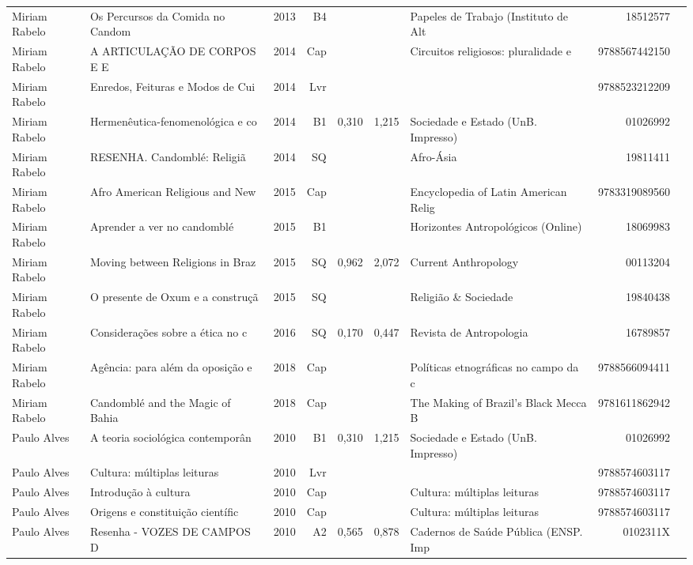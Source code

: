\documentclass[12pt,brazil]{article}\usepackage[]{graphicx}\usepackage[]{xcolor}
\begin{document}
\begin{longtable}{lllrrllrr}
Miriam Rabelo & Os Percursos da Comida no Candom & 2013 & B4 &  &  & Papeles de Trabajo (Instituto de Alt & 18512577 \\
Miriam Rabelo & A ARTICULAÇÃO DE CORPOS E E & 2014 & Cap &  &  & Circuitos religiosos: pluralidade e  & 9788567442150 \\
Miriam Rabelo & Enredos, Feituras e Modos de Cui & 2014 & Lvr &  &  &  & 9788523212209 \\
\rowcolor{coautr}Miriam Rabelo & Hermenêutica-fenomenológica e co & 2014 & B1 & 0,310 & 1,215 & Sociedade e Estado (UnB. Impresso) & 01026992 \\
Miriam Rabelo & RESENHA. Candomblé: Religiã & 2014 & SQ &  &  & Afro-Ásia & 19811411 \\
Miriam Rabelo & Afro American Religious and New  & 2015 & Cap &  &  & Encyclopedia of Latin American Relig & 9783319089560 \\
Miriam Rabelo & Aprender a ver no candomblé & 2015 & B1 &  &  & Horizontes Antropológicos (Online) & 18069983 \\
Miriam Rabelo & Moving between Religions in Braz & 2015 & SQ & 0,962 & 2,072 & Current Anthropology & 00113204 \\
Miriam Rabelo & O presente de Oxum e a construçã & 2015 & SQ &  &  & Religião \& Sociedade & 19840438 \\
Miriam Rabelo & Considerações sobre a ética no c & 2016 & SQ & 0,170 & 0,447 & Revista de Antropologia & 16789857 \\
\rowcolor{coautr}Miriam Rabelo & Agência: para além da oposição e & 2018 & Cap &  &  & Políticas etnográficas no campo da c & 9788566094411 \\
Miriam Rabelo & Candomblé and the Magic of Bahia & 2018 & Cap &  &  & The Making of Brazil’s Black Mecca B & 9781611862942 \\
Paulo Alves & A teoria sociológica contemporân & 2010 & B1 & 0,310 & 1,215 & Sociedade e Estado (UnB. Impresso) & 01026992 \\
Paulo Alves & Cultura: múltiplas leituras & 2010 & Lvr &  &  &  & 9788574603117 \\
\rowcolor{capdup}Paulo Alves & Introdução à cultura & 2010 & Cap &  &  & Cultura: múltiplas leituras & 9788574603117 \\
\rowcolor{capdup}Paulo Alves & Origens e constituição científic & 2010 & Cap &  &  & Cultura: múltiplas leituras & 9788574603117 \\
Paulo Alves & Resenha - VOZES DE CAMPOS D & 2010 & A2 & 0,565 & 0,878 & Cadernos de Saúde Pública (ENSP. Imp & 0102311X \\

\end{longtable}
\end{document}

